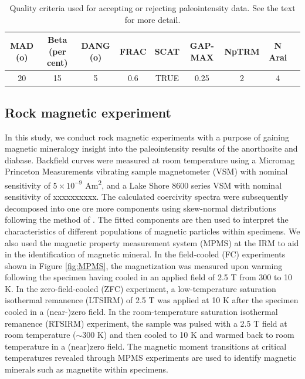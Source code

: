 \documentclass[draft]{agujournal2019}
\begin{document}
\begin{table}
\caption{Quality criteria used for accepting or rejecting paleointensity data. See the text for more detail.} 
\centering
\begin{tabular}{ccccccccc}
\hline
MAD (o) & Beta (per cent) & DANG (o) & FRAC& SCAT & GAP-MAX & NpTRM & N Arai\\
\hline
20 & 15 & 5 & 0.6 & TRUE & 0.25 & 2 & 4 \\
\hline

\end{tabular}
\label{tab:criteria}
\end{table}



\subsection*{Rock magnetic experiment}

In this study, we conduct rock magnetic experiments with a purpose of gaining magnetic mineralogy insight into the paleointensity results of the anorthosite and diabase. Backfield curves were measured at room temperature using a Micromag Princeton Measurements vibrating sample magnetometer (VSM) with nominal sensitivity of $5 \times 10^{-9}$ Am\textsuperscript{2}, and a Lake Shore 8600 series VSM with nominal sensitivity of xxxxxxxxxx. The calculated coercivity spectra were subsequently decomposed into one ore more components using skew-normal distributions following the method of . The fitted components are then used to interpret the characteristics of different populations of magnetic particles within specimens. We also used the magnetic property measurement system (MPMS) at the IRM to aid in the identification of magnetic mineral. In the field-cooled (FC) experiments shown in Figure \ref{fig:MPMS}, the magnetization was measured upon warming following the specimen having cooled in an applied field of 2.5 T from 300 to 10 K. In the zero-field-cooled (ZFC) experiment, a low-temperature saturation isothermal remanence (LTSIRM) of 2.5 T was applied at 10 K after the specimen cooled in a (near-)zero field. In the room-temperature saturation isothermal remanence (RTSIRM) experiment, the sample was pulsed with a 2.5 T field at room temperature ($\sim$300 K) and then cooled to 10 K and warmed back to room temperature in a (near)zero field. The magnetic moment transitions at critical temperatures revealed through MPMS experiments are used to identify magnetic minerals such as magnetite \cite{Verwey1939a} within specimens. 
\end{document}
